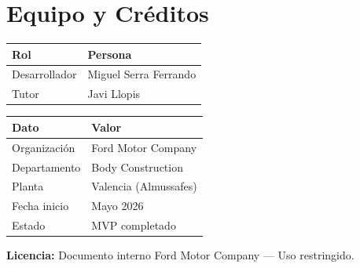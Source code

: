 \documentclass[11pt,a4paper]{article}
\begin{document}
\newpage


\section{Equipo y Créditos}

\begin{center}
\begin{tabular}{ll}
\toprule
\textbf{Rol} & \textbf{Persona} \\
\midrule
Desarrollador & Miguel Serra Ferrando \\
Tutor & Javi Llopis \\
\bottomrule
\end{tabular}
\end{center}

\vspace{1cm}

\begin{center}
\begin{tabular}{ll}
\toprule
\textbf{Dato} & \textbf{Valor} \\
\midrule
Organización & Ford Motor Company \\
Departamento & Body Construction \\
Planta & Valencia (Almussafes) \\
Fecha inicio & Mayo 2026 \\
Estado & MVP completado \\
\bottomrule
\end{tabular}
\end{center}

\vfill

\begin{center}
\textbf{Licencia:} Documento interno Ford Motor Company --- Uso restringido.
\end{center}
\end{document}
